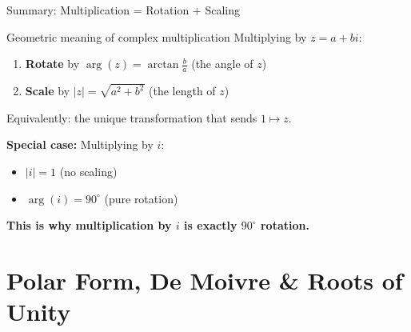 \documentclass[10pt]{beamer}
\theoremstyle{definition}
\newcommand{\x}[1]{\alert{\textbf{#1}}}
\begin{document}
\begin{frame}{Summary: Multiplication = Rotation + Scaling}

\begin{block}{Geometric meaning of complex multiplication}
Multiplying by $z = a + bi$:

\begin{enumerate}
\item \x{Rotate} by $\arg(z) = \arctan\frac{b}{a}$ \quad (the angle of $z$)
\item \x{Scale} by $|z| = \sqrt{a^2 + b^2}$ \quad (the length of $z$)
\end{enumerate}

\vfill

Equivalently: the unique transformation that sends $1 \mapsto z$.
\end{block}

\vfill\pause

\x{Special case:} Multiplying by $i$:
\begin{itemize}
\item $|i| = 1$ \quad (no scaling)
\item $\arg(i) = 90^{\circ}$ \quad (pure rotation)
\end{itemize}

\vfill

\x{This is why multiplication by $i$ is exactly $90^{\circ}$ rotation.}

\end{frame}


\section{Polar Form, De Moivre \& Roots of Unity}
\end{document}
